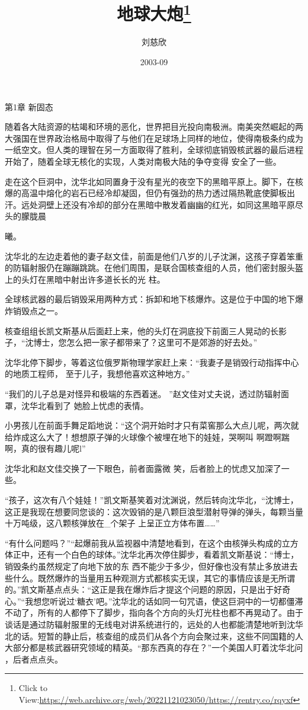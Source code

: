 \documentclass{article}
\title{地球大炮\footnote{Click to View:\url{https://web.archive.org/web/20221121023050/https://rentry.co/rqyxf}}}
\author{刘慈欣}
\date{2003-09}
\begin{document}

\maketitle


\Large


﻿第1章 新固态 

随着各大陆资源的枯竭和环境的恶化，世界把目光投向南极洲。南美突然崛起的两大强国在世界政治格局中取得了与他们在足球场上同样的地位，使得南极条约成为一纸空文。但人类的理智在另一方面取得了胜利，全球彻底销毁核武器的最后进程开始了，随着全球无核化的实现，人类对南极大陆的争夺变得
安全了一些。 

走在这个巨洞中，沈华北如同置身于没有星光的夜空下的黑暗平原上。脚下，在核爆的高温中熔化的岩石已经冷却凝固，但仍有强劲的热力透过隔热靴底使脚板出汗。远处洞壁上还没有冷却的部分在黑暗中散发着幽幽的红光，如同这黑暗平原尽头的朦胧晨
\newpage

曦。 

沈华北的左边走着他的妻子赵文佳，前面是他们八岁的儿子沈渊，这孩子穿着笨重的防辐射服仍在蹦蹦跳跳。在他们周围，是联合国核查组的人员，他们密封服头盔上的头灯在黑暗中射出许多道长长的光
柱。 

全球核武器的最后销毁采用两种方式：拆卸和地下核爆炸。这是位于中国的地下爆炸销毁点之一。
 

核查组组长凯文斯基从后面赶上来，他的头灯在洞底投下前面三人晃动的长影子，“沈博士，您怎么把一家子都带来了？这里可不是郊游的好去处。”

沈华北停下脚步，等着这位俄罗斯物理学家赶上来：“我妻子是销毁行动指挥中心的地质工程师，
至于儿子，我想他喜欢这种地方。” 

“我们的儿子总是对怪异和极端的东西着迷。
\newpage
”赵文佳对丈夫说，透过防辐射面罩，沈华北看到了
她脸上忧虑的表情。 

小男孩儿在前面手舞足蹈地说：“这个洞开始时才只有菜窖那么大点儿呢，两次就给炸成这么大了！想想原子弹的火球像个被埋在地下的娃娃，哭啊叫
啊蹬啊踹啊，真的很有趣儿呢l” 

沈华北和赵文佳交换了一下眼色，前者面露微
笑，后者脸上的忧虑又加深了一些。 

“孩子，这次有八个娃娃！”凯文斯基笑着对沈渊说，然后转向沈华北，“沈博士，这正是我现在想要同您谈的：这次毁销的是八颗巨浪型潜射导弹的弹头，每颗当量十万吨级，这八颗核弹放在_个架子
上呈正立方体布置……” 

“有什么问题吗？”“起爆前我从监视器中清楚地看到，在这个由核弹头构成的立方体正中，还有一个白色的球体。”沈华北再次停住脚步，看着凯文斯基说：“博士，销毁条约虽然规定了向地下放的东
\newpage
西不能少于多少，但好像也没有禁止多放进去些什么。既然爆炸的当量用五种观测方式都核实无误，其它的事情应该是无所谓的。”凯文斯基点点头：“这正是我在爆炸后才提这个问题的原因，只是出于好奇心。”“我想您听说过‘糖衣’吧。”沈华北的话如同一句咒语，使这巨洞中的一切都僵滞不动了，所有的人都停下了脚步，指向各个方向的头灯光柱也都不再晃动了。由于谈话是通过防辐射服里的无线电对讲系统进行的，远处的人也都能清楚地听到沈华北的话。短暂的静止后，核查组的成员们从各个方向会聚过来，这些不同国籍的人大部分都是核武器研究领域的精英。“那东西真的存在？”一个美国人盯着沈华北问
，后者点点头。 
\end{document}
